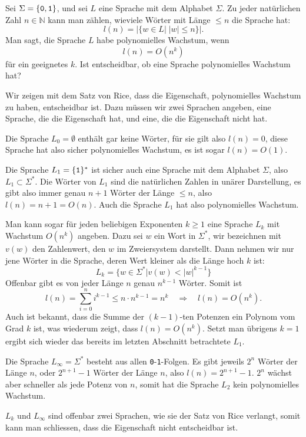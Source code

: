 Sei $\Sigma=\{\text{\tt 0},\text{\tt 1}\}$, und sei $L$ eine Sprache
mit dem Alphabet $\Sigma$. Zu jeder natürlichen Zahl $n\in\mathbb N$
kann man zählen, wieviele Wörter mit Länge $\le n$ die Sprache
hat:
\[
l(n)=|\{w\in L|\;|w|\le n\}|.
\]
Man sagt, die Sprache $L$ habe polynomielles Wachstum, wenn
\[
l(n)=O(n^k)
\]
für ein geeignetes $k$. Ist entscheidbar, ob eine Sprache polynomielles
Wachstum hat?


\begin{loesung}
Wir zeigen mit dem Satz von Rice, dass die Eigenschaft, polynomielles
Wachstum zu haben, entscheidbar ist. Dazu müssen wir zwei Sprachen
angeben, eine Sprache, die die Eigenschaft hat, und eine, die die
Eigenschaft nicht hat.

Die Sprache $L_0=\emptyset$ enthält gar keine Wörter, für sie
gilt also $l(n)=0$, diese Sprache hat also sicher polynomielles
Wachstum, es ist sogar $l(n)=O(1)$.

Die Sprache $L_1=\{\text{\tt 1}\}^*$ ist sicher auch eine Sprache mit
dem Alphabet $\Sigma$, also $L_1\subset \Sigma^*$. Die Wörter
von $L_1$ sind die natürlichen Zahlen in unärer Darstellung,
es gibt also immer genau $n+1$ Wörter der Länge $\le n$, also
$l(n)=n+1=O(n)$. Auch die Sprache $L_1$ hat also polynomielles Wachstum.

Man kann sogar für jeden beliebigen Exponenten $k\ge 1$ eine Sprache $L_k$
mit Wachstum $O(n^k)$ angeben. Dazu sei $w$ ein Wort in $\Sigma^*$,
wir bezeichnen mit $v(w)$ den Zahlenwert, den $w$ im Zweiersystem
darstellt. Dann nehmen wir nur jene Wörter in die Sprache,
deren Wert kleiner als die Länge hoch $k$ ist:
\[
L_k=\{ w\in\Sigma^*| v(w) < |w|^{k-1}\}
\]
Offenbar gibt es von jeder Länge $n$ genau $n^{k-1}$ Wörter.
Somit ist
\[
l(n)=\sum_{i=0}^ni^{k-1}\le n\cdot n^{k-1}=n^k\quad\Rightarrow\quad l(n)=O(n^k).
\]
Auch ist bekannt, dass die Summe der $(k-1)$-ten Potenzen ein
Polynom vom Grad $k$ ist, was wiederum zeigt, dass $l(n)=O(n^k)$.
Setzt man übrigens $k=1$ ergibt
sich wieder das bereits im letzten Abschnitt betrachtete
$L_1$.

Die Sprache $L_\infty=\Sigma^*$ besteht aus allen {\tt 0}-{\tt 1}-Folgen.
Es gibt jeweils $2^n$ Wörter der Länge $n$, oder $2^{n+1}-1$ Wörter
der Länge $n$, also $l(n)=2^{n+1}-1$. $2^n$ wächst aber schneller
als jede Potenz von $n$, somit hat die Sprache $L_2$ kein polynomielles
Wachstum.

$L_k$ und $L_\infty$ sind offenbar zwei Sprachen, wie sie der Satz von
Rice verlangt, somit kann man schliessen, dass die Eigenschaft
nicht entscheidbar ist.
\end{loesung}
